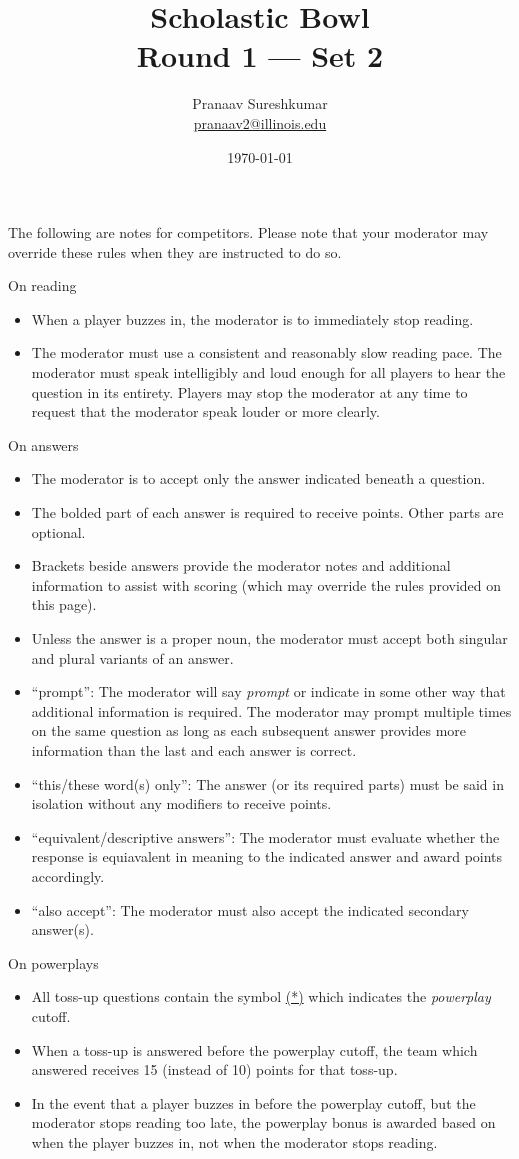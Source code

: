 \documentclass{report}
\title{\textbf{Scholastic Bowl} \\ Round 1 --- Set 2}
\author{Pranaav Sureshkumar \\ \href{mailto:pranaav2@illinois.edu}{pranaav2@illinois.edu}}
\date{\today}
\begin{document}
\thispagestyle{empty}
The following are notes for competitors. Please note that your moderator may override these rules when they are instructed to do so.

\vspace*{0.3 cm}
On reading
\begin{itemize}
    \item When a player buzzes in, the moderator is to immediately stop reading.
    \item The moderator must use a consistent and reasonably slow reading pace. The moderator must speak intelligibly and loud enough for all players to hear the question in its entirety. Players may stop the moderator at any time to request that the moderator speak louder or more clearly.
\end{itemize}

\vspace*{0.3 cm}
On answers
\begin{itemize}
    \item The moderator is to accept only the answer indicated beneath a question.
    \item The bolded part of each answer is required to receive points. Other parts are optional.
    \item Brackets beside answers provide the moderator notes and additional information to assist with scoring (which may override the rules provided on this page).
    \item Unless the answer is a proper noun, the moderator must accept both singular and plural variants of an answer. 
    \item ``prompt'': The moderator will say \textit{prompt} or indicate in some other way that additional information is required. The moderator may prompt multiple times on the same question as long as each subsequent answer provides more information than the last and each answer is correct.
    \item ``this/these word(s) only'': The answer (or its required parts) must be said in isolation without any modifiers to receive points.
    \item ``equivalent/descriptive answers'': The moderator must evaluate whether the response is equiavalent in meaning to the indicated answer and award points accordingly.
    \item ``also accept'': The moderator must also accept the indicated secondary answer(s).
\end{itemize}

\vspace*{0.3 cm}
On powerplays
\begin{itemize}
    \item All toss-up questions contain the symbol \underline{(*)} which indicates the \textit{powerplay} cutoff.
    \item When a toss-up is answered before the powerplay cutoff, the team which answered receives 15 (instead of 10) points for that toss-up.
    \item In the event that a player buzzes in before the powerplay cutoff, but the moderator stops reading too late, the powerplay bonus is awarded based on when the player buzzes in, not when the moderator stops reading.
\end{itemize}
\end{document}
